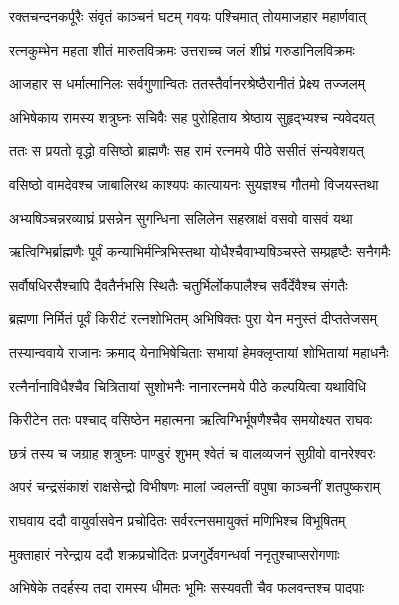 \twolineshloka
{रक्तचन्दनकर्पूरैः संवृतं काञ्चनं घटम्}
{गवयः पश्चिमात् तोयमाजहार महार्णवात्} %

\twolineshloka
{रत्नकुम्भेन महता शीतं मारुतविक्रमः}
{उत्तराच्च जलं शीघ्रं गरुडानिलविक्रमः} %

\twolineshloka
{आजहार स धर्मात्मानिलः सर्वगुणान्वितः}
{ततस्तैर्वानरश्रेष्ठैरानीतं प्रेक्ष्य तज्जलम्} %

\twolineshloka
{अभिषेकाय रामस्य शत्रुघ्नः सचिवैः सह}
{पुरोहिताय श्रेष्ठाय सुहृद्भ्यश्च न्यवेदयत्} %

\twolineshloka
{ततः स प्रयतो वृद्धो वसिष्ठो ब्राह्मणैः सह}
{रामं रत्नमये पीठे ससीतं संन्यवेशयत्} %

\twolineshloka
{वसिष्ठो वामदेवश्च जाबालिरथ काश्यपः}
{कात्यायनः सुयज्ञश्च गौतमो विजयस्तथा} %

\twolineshloka
{अभ्यषिञ्चन्नरव्याघ्रं प्रसन्नेन सुगन्धिना}
{सलिलेन सहस्राक्षं वसवो वासवं यथा} %

\twolineshloka
{ऋत्विग्भिर्ब्राह्मणैः पूर्वं कन्याभिर्मन्त्रिभिस्तथा}
{योधैश्चैवाभ्यषिञ्चस्ते सम्प्रहृष्टैः सनैगमैः} %

\twolineshloka
{सर्वौषधिरसैश्चापि दैवतैर्नभसि स्थितैः}
{चतुर्भिर्लोकपालैश्च सर्वैर्देवैश्च संगतैः} %

\twolineshloka
{ब्रह्मणा निर्मितं पूर्वं किरीटं रत्नशोभितम्}
{अभिषिक्तः पुरा येन मनुस्तं दीप्ततेजसम्} %

\twolineshloka
{तस्यान्ववाये राजानः क्रमाद् येनाभिषेचिताः}
{सभायां हेमक्लृप्तायां शोभितायां महाधनैः} %

\twolineshloka
{रत्नैर्नानाविधैश्चैव चित्रितायां सुशोभनैः}
{नानारत्नमये पीठे कल्पयित्वा यथाविधि} %

\twolineshloka
{किरीटेन ततः पश्चाद् वसिष्ठेन महात्मना}
{ऋत्विग्भिर्भूषणैश्चैव समयोक्ष्यत राघवः} %

\twolineshloka
{छत्रं तस्य च जग्राह शत्रुघ्नः पाण्डुरं शुभम्}
{श्वेतं च वालव्यजनं सुग्रीवो वानरेश्वरः} %

\twolineshloka
{अपरं चन्द्रसंकाशं राक्षसेन्द्रो विभीषणः}
{मालां ज्वलन्तीं वपुषा काञ्चनीं शतपुष्कराम्} %

\twolineshloka
{राघवाय ददौ वायुर्वासवेन प्रचोदितः}
{सर्वरत्नसमायुक्तं मणिभिश्च विभूषितम्} %

\twolineshloka
{मुक्ताहारं नरेन्द्राय ददौ शक्रप्रचोदितः}
{प्रजगुर्देवगन्धर्वा ननृतुश्चाप्सरोगणाः} %

\twolineshloka
{अभिषेके तदर्हस्य तदा रामस्य धीमतः}
{भूमिः सस्यवती चैव फलवन्तश्च पादपाः} %

